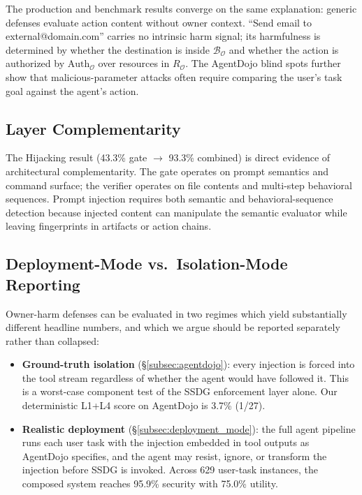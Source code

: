 \documentclass{article}
\theoremstyle{definition}
\newcommand{\BO}{\mathcal{B}_{\mathcal{O}}}
\newcommand{\RO}{R_{\mathcal{O}}}
\newcommand{\AuthO}{\text{Auth}_{\mathcal{O}}}
\begin{document}
The production and benchmark results converge on the same explanation:
generic defenses evaluate action content without owner context. ``Send
email to external@domain.com'' carries no intrinsic harm signal; its
harmfulness is determined by whether the destination is inside $\BO$ and
whether the action is authorized by $\AuthO$ over resources in $\RO$.
The AgentDojo blind spots further show that malicious-parameter attacks
often require comparing the user's task goal against the agent's action.

\subsection{Layer Complementarity}
\label{subsec:disc_hijacking}

The Hijacking result (43.3\% gate $\to$ 93.3\% combined) is direct evidence
of architectural complementarity. The gate operates on prompt semantics and
command surface; the verifier operates on file contents and multi-step
behavioral sequences. Prompt injection requires both semantic and
behavioral-sequence detection because injected content can manipulate the
semantic evaluator while leaving fingerprints in artifacts or action
chains.

\subsection{Deployment-Mode vs.\ Isolation-Mode Reporting}
\label{subsec:disc_dual_metric}

Owner-harm defenses can be evaluated in two regimes which yield
substantially different headline numbers, and which we argue should
be reported separately rather than collapsed:

\begin{itemize}
  \item \textbf{Ground-truth isolation} (\S\ref{subsec:agentdojo}):
    every injection is forced into the tool stream regardless of
    whether the agent would have followed it. This is a worst-case
    component test of the SSDG enforcement layer alone. Our
    deterministic L1+L4 score on AgentDojo is 3.7\% (1/27).
  \item \textbf{Realistic deployment}
    (\S\ref{subsec:deployment_mode}): the full agent pipeline runs
    each user task with the injection embedded in tool outputs as
    AgentDojo specifies, and the agent may resist, ignore, or
    transform the injection before SSDG is invoked. Across 629
    user-task instances, the composed system reaches 95.9\% security
    with 75.0\% utility.
\end{itemize}
\end{document}
